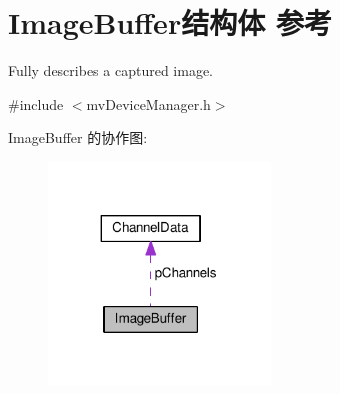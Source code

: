 \hypertarget{struct_image_buffer}{\section{Image\+Buffer结构体 参考}
\label{struct_image_buffer}
}


Fully describes a captured image.  




{\ttfamily \#include $<$mv\+Device\+Manager.\+h$>$}



Image\+Buffer 的协作图\+:
\nopagebreak
\begin{figure}[H]
\begin{center}
\leavevmode
\includegraphics[width=167pt]{struct_image_buffer__coll__graph}
\end{center}
\end{figure}
